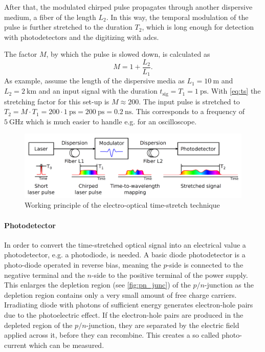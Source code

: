 After that, the modulated chirped pulse propagates through another dispersive medium, a fiber of the length $L_2$.
In this way, the temporal modulation of the pulse is further stretched to the duration $T_2$, which is long enough for detection with photodetectors and the digitizing with \Glspl{adc}. \cite{roussel2014} 

The factor $M$, by which the pulse is slowed down, is calculated as
\begin{equation}\label{eq:ts}
	M = 1 + \frac{L_2}{L_1}.
\end{equation}
As example, assume the length of the dispersive media as $L_1 = \SI{10}{\meter}$ and $L_2 = \SI{2}{\kilo \meter}$ and an input signal with the duration $t_\text{sig} = T_1 = \SI{1}{\pico \second}$. 
With \autoref{eq:ts} the stretching factor for this set-up is $M \approx 200$. The input pulse is stretched to $T_2 = M \cdot T_1 = 200 \cdot \SI{1}{\pico \second} = \SI{200}{\pico \second} = \SI{0.2}{\nano \second}$.
This corresponds to a frequency of $\SI{5}{\GHz}$ which is much easier to handle e.g. for an oscilloscope.

\begin{figure}[tb]
	\centering
	\includegraphics[width = \textwidth]{chap/02-theory/img/time_stretch.png}
	\caption{Working principle of the electro-optical time-stretch technique \cite{roussel2014}}
	\label{fig:eo_ts}
\end{figure}

\paragraph{Photodetector}
In order to convert the time-stretched optical signal into an electrical value a photodetector, e.g. a photodiode, is needed.
A basic diode photodetector is a photo-diode operated in reverse bias, meaning the $p$-side is connected to the negative terminal and the $n$-side to the positive terminal of the power supply. %
This enlarges the depletion region (see \autoref{fig:pn_junc}) of the $p/n$-junction as the depletion region contains only a very small amount of free charge carriers. 
Irradiating diode with photons of sufficient energy generates electron-hole pairs due to the photoelectric effect. %
If the electron-hole pairs are produced in the depleted region of the $p/n$-junction, they are separated by the electric field applied across it, before they can recombine. 
This creates a so called photo-current which can be measured. \cite{photodiode} %

